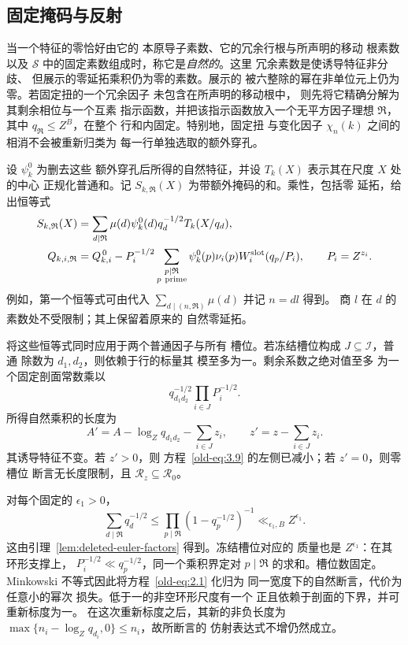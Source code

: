 \documentclass[11pt,a4paper]{article}
\numberwithin{equation}{section}
\numberwithin{figure}{section}
\theoremstyle{definition}
\theoremstyle{remark}
\begin{document}
\subsection{固定掩码与反射}

当一个特征的零恰好由它的
本原导子素数、它的冗余行根与所声明的移动
根素数以及 \(\mathcal S\) 中的固定素数组成时，称它是\emph{自然的}。这里
冗余素数是使诱导特征非分歧、
但展示的零延拓乘积仍为零的素数。展示的
被六整除的幂在非单位元上仍为零。若固定扭的一个冗余因子
未包含在所声明的移动根中，
则先将它精确分解为其剩余相位与一个互素
指示函数，并把该指示函数放入一个无平方因子理想
\(\mathfrak R\)，其中 \(q_{\mathfrak R}\le Z^B\)，在整个
行和内固定。特别地，固定扭
与变化因子 \(\chi_n(k)\) 之间的相消不会被重新归类为
每一行单独选取的额外穿孔。

设 \(\psi_k^0\) 为删去这些
额外穿孔后所得的自然特征，并设 \(T_k(X)\) 表示其在尺度 \(X\) 处的中心
正规化普通和。记 \(S_{k,\mathfrak R}(X)\)
为带额外掩码的和。乘性，包括零
延拓，给出恒等式
\begin{align}
 S_{k,\mathfrak R}(X)
 &=\sum_{d\mid\mathfrak R}\mu(d)\psi_k^0(d)q_d^{-1/2}
                  T_k(X/q_d),
 \label{old-eq:2.1a}\\
 Q_{k,i,\mathfrak R}
 &=Q_{k,i}^{\,0}
   -P_i^{-1/2}\sum_{\substack{p\mid\mathfrak R\\p\ {\rm prime}}}
       \psi_k^0(p)\nu_i(p)W_i^{\rm slot}(q_p/P_i),
 \qquad P_i=Z^{z_i}.
 \label{eq:prime-mask-erasure}
\end{align}
例如，第一个恒等式可由代入
\(\sum_{d\mid(n,\mathfrak R)}\mu(d)\) 并记 \(n=dl\) 得到。
商 \(l\) 在 \(d\) 的素数处不受限制；其上保留着原来的
自然零延拓。

将这些恒等式同时应用于两个普通因子与所有
槽位。若冻结槽位构成 \(J\subseteq\mathcal I\)，普通
除数为 \(d_1,d_2\)，则依赖于行的标量其
模至多为一。剩余系数之绝对值至多
为一个固定剖面常数乘以
\[
 q_{d_1d_2}^{-1/2}\prod_{i\in J}P_i^{-1/2}.
\]
所得自然乘积的长度为
\[
 A'=A-\log_Zq_{d_1d_2}-\sum_{i\in J}z_i,\qquad
 z'=z-\sum_{i\in J}z_i.
\]
其诱导特征不变。若 \(z'>0\)，则
方程~\eqref{old-eq:3.9} 的左侧已减小；若 \(z'=0\)，则零槽位
断言无长度限制，且
\(\mathcal R_z\subseteq\mathcal R_0\)。

对每个固定的 \(\epsilon_1>0\)，
\begin{equation}
 \sum_{d\mid\mathfrak R}q_d^{-1/2}
 \le \prod_{p\mid\mathfrak R}(1-q_p^{-1/2})^{-1}
 \ll_{\epsilon_1,B} Z^{\epsilon_1}.
 \label{old-eq:2.1b}
\end{equation}
这由引理~\ref{lem:deleted-euler-factors} 得到。冻结槽位对应的
质量也是 \(Z^{\epsilon_1}\)：在其环形支撑上，
\(P_i^{-1/2}\ll q_p^{-1/2}\)，同一个乘积界定对
\(p\mid\mathfrak R\) 的求和。槽位数固定。Minkowski
不等式因此将方程~\eqref{old-eq:2.1} 化归为
同一宽度下的自然断言，代价为任意小的幂次
损失。低于一的非空环形尺度有一个
正且依赖于剖面的下界，并可重新标度为一。
在这次重新标度之后，其新的非负长度为
\(\max\{n_i-\log_Zq_{d_i},0\}\le n_i\)，故所断言的
仿射表达式不增仍然成立。
\end{document}
